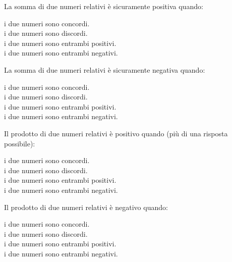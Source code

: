 \begin{esercizio}
La somma di due numeri relativi è sicuramente positiva quando:
 \begin{multicols}{2}
 \noindent
  \quad i due numeri sono concordi.\\
  \quad i due numeri sono discordi.\\
  \quad i due numeri sono entrambi positivi.\\
  \quad i due numeri sono entrambi negativi.
 \end{multicols}
\end{esercizio}

\begin{esercizio}
La somma di due numeri relativi è sicuramente negativa quando:
 \begin{multicols}{2}
 \noindent
  \quad i due numeri sono concordi.\\
  \quad i due numeri sono discordi.\\
  \quad i due numeri sono entrambi positivi.\\
  \quad i due numeri sono entrambi negativi.
 \end{multicols}
\end{esercizio}

\begin{esercizio}
Il prodotto di due numeri relativi è positivo quando (più di una risposta 
possibile):
 \begin{multicols}{2}
 \noindent
  \quad i due numeri sono concordi.\\
  \quad i due numeri sono discordi.\\
  \quad i due numeri sono entrambi positivi.\\
  \quad i due numeri sono entrambi negativi.
 \end{multicols}
\end{esercizio}

\begin{esercizio}
Il prodotto di due numeri relativi è negativo quando:
 \begin{multicols}{2}
 \noindent
  \quad i due numeri sono concordi.\\
  \quad i due numeri sono discordi.\\
  \quad i due numeri sono entrambi positivi.\\
  \quad i due numeri sono entrambi negativi.
 \end{multicols}
\end{esercizio}

